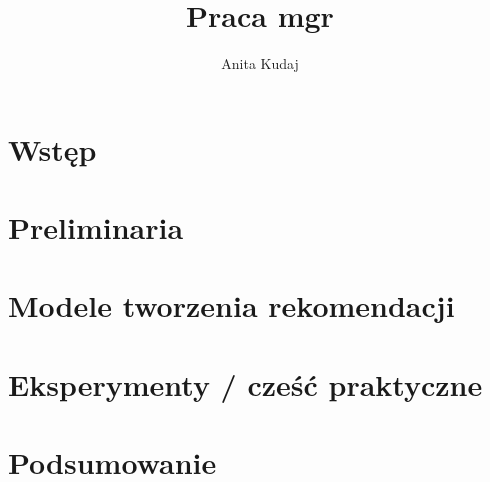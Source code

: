 \documentclass[10pt,a4paper]{report}
\author{Anita Kudaj}
\title{Praca mgr}
\begin{document}
\maketitle

\tableofcontents

\chapter{Wstęp}
\chapter{Preliminaria} %

\chapter{Modele tworzenia rekomendacji}

\chapter{Eksperymenty / cześć praktyczne}

\chapter{Podsumowanie}
\end{document}
